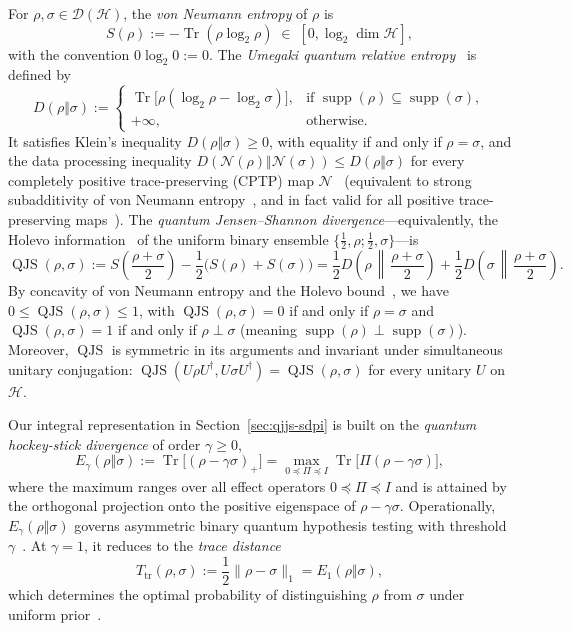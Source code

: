 \documentclass[10pt,a4paper]{article}
\numberwithin{equation}{section}
\theoremstyle{plain}
\theoremstyle{definition}
\theoremstyle{remark}
\DeclareMathOperator{\Tr}{Tr}
\DeclareMathOperator{\supp}{supp}
\DeclareMathOperator{\QJS}{QJS}
\newcommand{\cH}{\mathcal{H}}
\newcommand{\cD}{\mathcal{D}}
\newcommand{\cN}{\mathcal{N}}
\begin{document}
For $\rho, \sigma \in \cD(\cH)$, the \emph{von Neumann entropy} of $\rho$ is
\[
S(\rho) := -\Tr(\rho \log_2 \rho) \;\in\; [0, \log_2 \dim \cH],
\]
with the convention $0 \log_2 0 := 0$. The \emph{Umegaki quantum relative entropy}~\cite{Umegaki1962} is defined by
\[
D(\rho \Vert \sigma) :=
\begin{cases}
\Tr\!\bigl[\rho(\log_2 \rho - \log_2 \sigma)\bigr], & \text{if } \supp(\rho) \subseteq \supp(\sigma),\\
+\infty, & \text{otherwise.}
\end{cases}
\]
It satisfies Klein's inequality $D(\rho \Vert \sigma) \ge 0$, with equality if and only if $\rho = \sigma$, and the data processing inequality $D(\cN(\rho) \Vert \cN(\sigma)) \le D(\rho \Vert \sigma)$ for every completely positive trace-preserving (CPTP) map $\cN$~\cite{Lindblad1975} (equivalent to strong subadditivity of von Neumann entropy~\cite{LiebRuskai1973}, and in fact valid for all positive trace-preserving maps~\cite{MullerHermesReeb2017}). The \emph{quantum Jensen--Shannon divergence}—equivalently, the Holevo information~\cite{Holevo1973} of the uniform binary ensemble $\{\tfrac{1}{2}, \rho; \tfrac{1}{2}, \sigma\}$—is
\begin{equation}\label{eq:qjs-def}
\QJS(\rho, \sigma) := S\!\left(\frac{\rho + \sigma}{2}\right) - \frac{1}{2}\bigl(S(\rho) + S(\sigma)\bigr)
= \frac{1}{2} D\!\left(\rho \,\middle\Vert\, \frac{\rho + \sigma}{2}\right) + \frac{1}{2} D\!\left(\sigma \,\middle\Vert\, \frac{\rho + \sigma}{2}\right).
\end{equation}
By concavity of von Neumann entropy and the Holevo bound~\cite{Holevo1973}, we have $0 \le \QJS(\rho, \sigma) \le 1$, with $\QJS(\rho, \sigma) = 0$ if and only if $\rho = \sigma$ and $\QJS(\rho, \sigma) = 1$ if and only if $\rho \perp \sigma$ (meaning $\supp(\rho) \perp \supp(\sigma)$). Moreover, $\QJS$ is symmetric in its arguments and invariant under simultaneous unitary conjugation: $\QJS(U\rho U^{\dagger}, U\sigma U^{\dagger}) = \QJS(\rho, \sigma)$ for every unitary $U$ on $\cH$.

Our integral representation in Section~\ref{sec:qjjs-sdpi} is built on the \emph{quantum hockey-stick divergence} of order $\gamma \ge 0$,
\begin{equation}\label{eq:hockey-stick-def}
E_{\gamma}(\rho \Vert \sigma) := \Tr\!\bigl[(\rho - \gamma \sigma)_+\bigr] = \max_{0 \preceq \Pi \preceq I} \Tr\!\bigl[\Pi(\rho - \gamma \sigma)\bigr],
\end{equation}
where the maximum ranges over all effect operators $0 \preceq \Pi \preceq I$ and is attained by the orthogonal projection onto the positive eigenspace of $\rho - \gamma \sigma$. Operationally, $E_\gamma(\rho \Vert \sigma)$ governs asymmetric binary quantum hypothesis testing with threshold $\gamma$~\cite{Helstrom1976,HircheTomamichel2024}. At $\gamma = 1$, it reduces to the \emph{trace distance}
\[
T_{\mathrm{tr}}(\rho, \sigma) := \frac{1}{2}\lVert \rho - \sigma \rVert_1 = E_1(\rho \Vert \sigma),
\]
which determines the optimal probability of distinguishing $\rho$ from $\sigma$ under uniform prior~\cite{Helstrom1976}.
\end{document}
